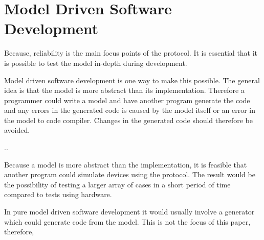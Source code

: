 \section{Model Driven Software Development}
Because, reliability is the main focus points of the protocol.
It is essential that it is possible to test the model in-depth during development.

Model driven software development is one way to make this possible.
The general idea is that the model is more abstract than its implementation.
Therefore a programmer could write a model and have another program generate the code and any errors in the generated code is caused by the model itself or an error in the model to code compiler.
Changes in the generated code should therefore be avoided.





..


Because a model is more abstract than the implementation, it is feasible that another program could simulate devices using the protocol.
The result would be the possibility of testing a larger array of cases in a short period of time compared to tests using hardware.

In pure model driven software development it would usually involve a generator which could generate code from the model. 
This is not the focus of this paper, therefore, 